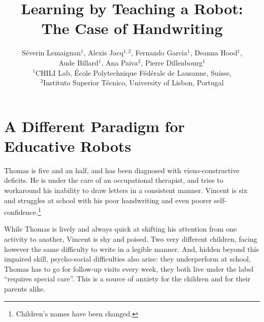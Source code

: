 \documentclass{article}
\title{Learning by Teaching a Robot:\\The Case of Handwriting}
\author{S\'everin Lemaignan$^1$, Alexis Jacq$^{1,2}$, Fernando Garcia$^1$,
    Deanna Hood$^1$, \\Aude
    Billard$^1$, Ana Paiva$^2$, Pierre Dillenbourg$^1$ \\
$^1$CHILI Lab, \'Ecole Polytechnique F\'ed\'erale de Lausanne, Suisse,\\
$^2$Instituto Superior T\'{e}cnico, University of Lisbon, Portugal}
\begin{document}
\maketitle

%
%


\section{A Different Paradigm for Educative Robots}

Thomas is five and an half, and has been diagnosed with visuo-constructive
deficits. He is under the care of an occupational therapist, and tries to
workaround his inability to draw letters in a consistent manner. Vincent is six
and struggles at school with his poor handwriting and even poorer
self-confidence.\footnote{Children's names have been changed.}

While Thomas is lively and always quick at shifting his attention from one
activity to another, Vincent is shy and poised. Two very different children,
facing however the same difficulty to write in a legible manner. And, hidden
beyond this impaired skill, psycho-social difficulties also arise: they
underperform at school, Thomas has to go for follow-up visits every week,
they both live under the label ``requires special care''. This is a source of
anxiety for the children and for their parents alike.
\end{document}

